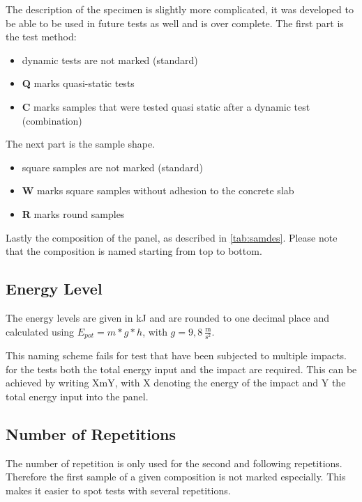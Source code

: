 The description of the specimen is slightly more complicated, it was developed to be able to be used in future tests as well and is over complete. The first part is the test method:

\begin{itemize}
    \item dynamic tests are not marked (standard)
    \item \textbf{Q} marks quasi-static tests
    \item \textbf{C} marks samples that were tested quasi static after a dynamic test (combination)
\end{itemize}

The next part is the sample shape.

\begin{itemize}
    \item square samples are not marked (standard)
    \item \textbf{W} marks square samples without adhesion to the concrete slab
    \item \textbf{R} marks round samples
\end{itemize}

Lastly the composition of the panel, as described in \autoref{tab:samdes}. Please note that the composition is named starting from top to bottom. 


\subsection*{Energy Level}

The energy levels are given in kJ and are rounded to one decimal place and calculated using \(E_{pot} = m * g *h \), with \(g =9,8~\frac{\text{m}}{\text{s}^2}\). %

This naming scheme fails for test that have been subjected to multiple impacts. for the tests both the total energy input and the impact are required. This can be achieved by writing XmY, with X denoting the energy of the impact and Y the total energy input into the panel.

\subsection*{Number of Repetitions}

The number of repetition is only used for the second and following repetitions. Therefore the first sample of a given composition is not marked especially. This makes it easier to spot tests with several repetitions.

